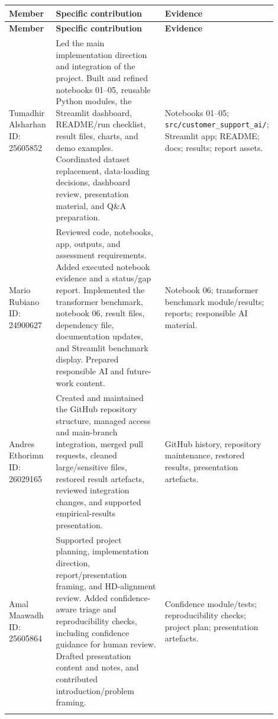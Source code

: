 \documentclass[11pt,a4paper]{article}
\begin{document}
\small
\begin{longtable}{>{\raggedright\arraybackslash}p{0.18\linewidth} >{\raggedright\arraybackslash}p{0.47\linewidth} >{\raggedright\arraybackslash}p{0.25\linewidth}}
\toprule
\textbf{Member} & \textbf{Specific contribution} & \textbf{Evidence}\\
\midrule
\endfirsthead
\toprule
\textbf{Member} & \textbf{Specific contribution} & \textbf{Evidence}\\
\midrule
\endhead
Tumadhir Alsharhan \newline ID: 25605852 & Led the main implementation direction and integration of the project. Built and refined notebooks 01--05, reusable Python modules, the Streamlit dashboard, README/run checklist, result files, charts, and demo examples. Coordinated dataset replacement, data-loading decisions, dashboard review, presentation material, and Q\&A preparation. & Notebooks 01--05; \texttt{src/customer\_support\_ai/}; Streamlit app; README; docs; results; report assets.\\
\addlinespace
Mario Rubiano \newline ID: 24900627 & Reviewed code, notebooks, app, outputs, and assessment requirements. Added executed notebook evidence and a status/gap report. Implemented the transformer benchmark, notebook 06, result files, dependency file, documentation updates, and Streamlit benchmark display. Prepared responsible AI and future-work content. & Notebook 06; transformer benchmark module/results; reports; responsible AI material.\\
\addlinespace
Andres Ethorimn \newline ID: 26029165 & Created and maintained the GitHub repository structure, managed access and main-branch integration, merged pull requests, cleaned large/sensitive files, restored result artefacts, reviewed integration changes, and supported empirical-results presentation. & GitHub history, repository maintenance, restored results, presentation artefacts.\\
\addlinespace
Amal Maawadh \newline ID: 25605864 & Supported project planning, implementation direction, report/presentation framing, and HD-alignment review. Added confidence-aware triage and reproducibility checks, including confidence guidance for human review. Drafted presentation content and notes, and contributed introduction/problem framing. & Confidence module/tests; reproducibility checks; project plan; presentation artefacts.\\
\addlinespace

\end{longtable}
\end{document}
